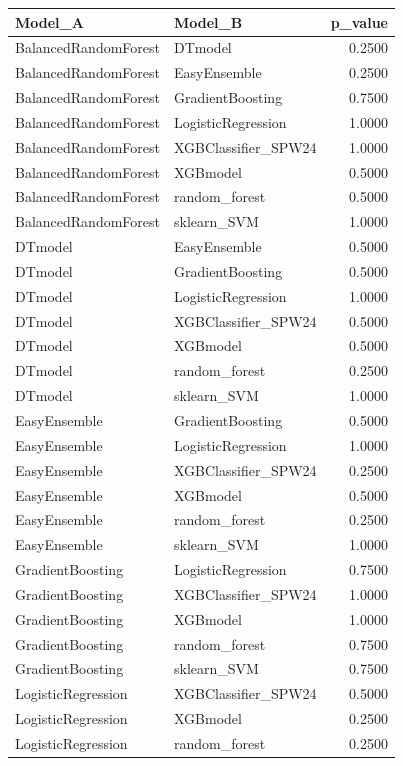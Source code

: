\begin{table}[t]
\centering
\begin{tabular}{llr}
\toprule
Model_A & Model_B & p_value \\
\midrule
BalancedRandomForest & DTmodel & 0.2500 \\
BalancedRandomForest & EasyEnsemble & 0.2500 \\
BalancedRandomForest & GradientBoosting & 0.7500 \\
BalancedRandomForest & LogisticRegression & 1.0000 \\
BalancedRandomForest & XGBClassifier_SPW24 & 1.0000 \\
BalancedRandomForest & XGBmodel & 0.5000 \\
BalancedRandomForest & random_forest & 0.5000 \\
BalancedRandomForest & sklearn_SVM & 1.0000 \\
DTmodel & EasyEnsemble & 0.5000 \\
DTmodel & GradientBoosting & 0.5000 \\
DTmodel & LogisticRegression & 1.0000 \\
DTmodel & XGBClassifier_SPW24 & 0.5000 \\
DTmodel & XGBmodel & 0.5000 \\
DTmodel & random_forest & 0.2500 \\
DTmodel & sklearn_SVM & 1.0000 \\
EasyEnsemble & GradientBoosting & 0.5000 \\
EasyEnsemble & LogisticRegression & 1.0000 \\
EasyEnsemble & XGBClassifier_SPW24 & 0.2500 \\
EasyEnsemble & XGBmodel & 0.5000 \\
EasyEnsemble & random_forest & 0.2500 \\
EasyEnsemble & sklearn_SVM & 1.0000 \\
GradientBoosting & LogisticRegression & 0.7500 \\
GradientBoosting & XGBClassifier_SPW24 & 1.0000 \\
GradientBoosting & XGBmodel & 1.0000 \\
GradientBoosting & random_forest & 0.7500 \\
GradientBoosting & sklearn_SVM & 0.7500 \\
LogisticRegression & XGBClassifier_SPW24 & 0.5000 \\
LogisticRegression & XGBmodel & 0.2500 \\
LogisticRegression & random_forest & 0.2500 \\

\end{tabular}
\end{table}
